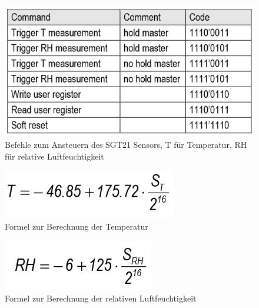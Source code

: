 \documentclass[]{article}
\begin{document}
\begin{figure}[h]
	\centering
	\includegraphics[scale=0.60]{images/sht21_commandset}
	\caption{Befehle zum Ansteuern des SGT21 Sensors, T für Temperatur, RH für relative Luftfeuchtigkeit~\cite{datasheetsht21}}
	\label{img:sht21_commandset}
\end{figure}
\begin{figure}[h]
	\centering
	\includegraphics[scale=0.60]{images/sht21_tempformula}
	\caption{Formel zur Berechnung der Temperatur~\cite{datasheetsht21}}
	\label{img:sht21_tempformula}
\end{figure}
\begin{figure}[h]
	\centering
	\includegraphics[scale=0.60]{images/sht21_rhformula}
	\caption{Formel zur Berechnung der relativen Luftfeuchtigkeit~\cite{datasheetsht21}}
	\label{img:sht21_rhformula}
\end{figure}
\end{document}
